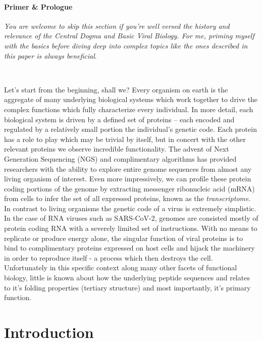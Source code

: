 \documentclass{article}
\begin{document}
\paragraph{Primer \& Prologue}
\textit{You are welcome to skip this section if you're well versed the history and relevance of the Central Dogma and Basic Viral Biology. 
For me, priming myself with the basics before diving deep into complex topics like the ones described in this paper is always beneficial}.

~

Let's start from the beginning, shall we?
Every organism on earth is the aggregate of many underlying biological systems which work together to drive the complex functions which fully characterize every individual.
In more detail, each biological system is driven by a defined set of proteins -- each encoded and regulated by a relatively small portion the individual's genetic code.
Each protein has a role to play which may be trivial by itself, but in concert with the other relevant proteins we observe incredible functionality. 
The advent of Next Generation Sequencing (NGS) and complimentary algorithms has provided researchers with the ability to explore entire genome sequences from almost any living organism of interest.
Even more impressively, we can profile these protein coding portions of the genome by extracting messenger ribonucleic acid (mRNA) from cells to infer the set of all expressed proteins, known as the \textit{transcriptome}. 
In contrast to living organisms the genetic code of a virus is extremely simplistic. 
In the case of RNA viruses such as SARS-CoV-2, genomes are consisted mostly of protein coding RNA with a severely limited set of instructions.
With no means to replicate or produce energy alone, the singular function of viral proteins is to bind to complimentary proteins expressed on host cells and hijack the machinery in order to reproduce itself - a process which then destroys the cell.
Unfortunately in this specific context along many other facets of functional biology, little is known about how the underlying peptide sequences and relates to it's folding properties (tertiary structure) and most importantly, it's primary function.

\section*{Introduction}
\end{document}
